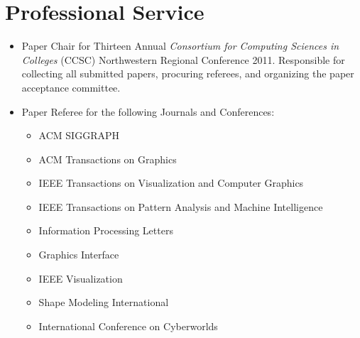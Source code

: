 \documentclass[10pt]{article}
\begin{document}


\section*{Professional Service}

\begin{itemize}
\item Paper Chair for Thirteen Annual {\em Consortium for Computing Sciences in Colleges} (CCSC)
Northwestern Regional Conference 2011. Responsible for collecting all submitted papers, procuring referees, and organizing the paper acceptance committee.

\item Paper Referee for the following Journals and Conferences:
\begin{itemize}
\item ACM SIGGRAPH
\item ACM Transactions on Graphics
\item IEEE Transactions on Visualization and Computer Graphics
\item IEEE Transactions on Pattern Analysis and Machine Intelligence
\item Information Processing Letters
\item Graphics Interface
\item IEEE Visualization
\item Shape Modeling International
\item International Conference on Cyberworlds
\end{itemize}
\end{itemize}



\end{document}
